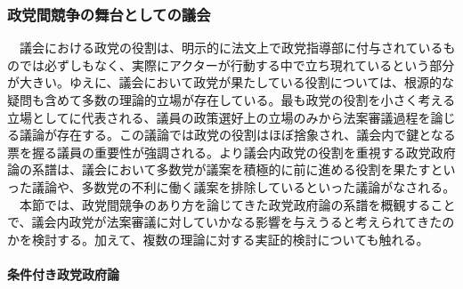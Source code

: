 \subsubsection{政党間競争の舞台としての議会}
　議会における政党の役割は、明示的に法文上で政党指導部に付与されているものでは必ずしもなく、実際にアクターが行動する中で立ち現れているという部分が大きい。ゆえに、議会において政党が果たしている役割については、根源的な疑問も含めて多数の理論的立場が存在している。最も政党の役割を小さく考える立場として\citet*{Krehbiel1998-ob,Krehbiel2010-ob}に代表される、議員の政策選好上の立場のみから法案審議過程を論じる議論が存在する。この議論では政党の役割はほぼ捨象され、議会内で鍵となる票を握る議員の重要性が強調される。より議会内政党の役割を重視する政党政府論の系譜は、議会において多数党が議案を積極的に前に進める役割を果たす\citep*{Rohde1991-da,Aldrich1995-xf}といった議論や、多数党の不利に働く議案を排除している\citep*{Cox2005-pn,Cox2007-xq}といった議論がなされる。\\
　本節では、政党間競争のあり方を論じてきた政党政府論の系譜を概観することで、議会内政党が法案審議に対していかなる影響を与えうると考えられてきたのかを検討する。加えて、複数の理論に対する実証的検討についても触れる。\\
\paragraph*{条件付き政党政府論}
